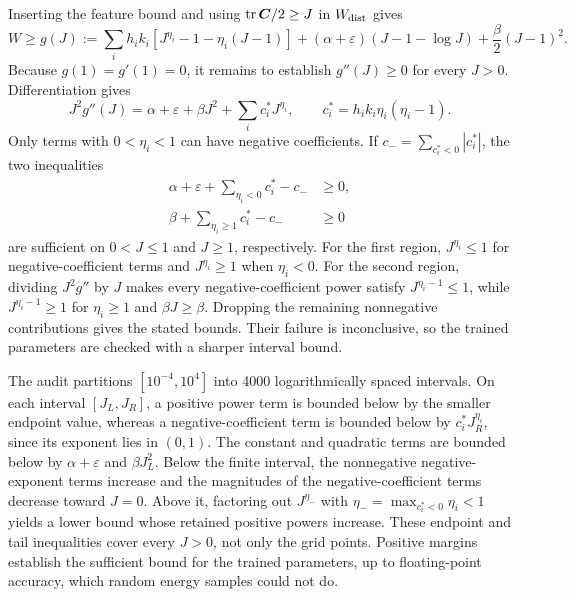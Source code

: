 Inserting the feature bound and using $\operatorname{tr}\bm C/2\geq J$ in $W_{\rm dist}$ gives
\begin{equation}
 W\geq g(J):=\sum_i h_i k_i[J^{\eta_i}-1-\eta_i(J-1)]
 +(\alpha+\varepsilon)(J-1-\log J)+\frac\beta2(J-1)^2.
 \label{eq:lowerbound}
\end{equation}
Because $g(1)=g'(1)=0$, it remains to establish $g''(J)\geq0$ for every $J>0$. Differentiation gives
\begin{equation}
 J^2g''(J)=\alpha+\varepsilon+\beta J^2+\sum_i c_i^*J^{\eta_i},
 \qquad c_i^*=h_i k_i\eta_i(\eta_i-1).
\end{equation}
Only terms with $0<\eta_i<1$ can have negative coefficients. If $c_-=\sum_{c_i^*<0}|c_i^*|$, the two inequalities
\begin{align}
 \alpha+\varepsilon+\sum_{\eta_i<0}c_i^*-c_-&\geq0,\\
 \beta+\sum_{\eta_i\geq1}c_i^*-c_-&\geq0
\end{align}
are sufficient on $0<J\leq1$ and $J\geq1$, respectively. For the first region, $J^{\eta_i}\leq1$ for negative-coefficient terms and $J^{\eta_i}\geq1$ when $\eta_i<0$. For the second region, dividing $J^2g''$ by $J$ makes every negative-coefficient power satisfy $J^{\eta_i-1}\leq1$, while $J^{\eta_i-1}\geq1$ for $\eta_i\geq1$ and $\beta J\geq\beta$. Dropping the remaining nonnegative contributions gives the stated bounds. Their failure is inconclusive, so the trained parameters are checked with a sharper interval bound.

The audit partitions $[10^{-4},10^4]$ into 4000 logarithmically spaced intervals. On each interval $[J_L,J_R]$, a positive power term is bounded below by the smaller endpoint value, whereas a negative-coefficient term is bounded below by $c_i^*J_R^{\eta_i}$, since its exponent lies in $(0,1)$. The constant and quadratic terms are bounded below by $\alpha+\varepsilon$ and $\beta J_L^2$. Below the finite interval, the nonnegative negative-exponent terms increase and the magnitudes of the negative-coefficient terms decrease toward $J=0$. Above it, factoring out $J^{\eta_-}$ with $\eta_-=\max_{c_i^*<0}\eta_i<1$ yields a lower bound whose retained positive powers increase. These endpoint and tail inequalities cover every $J>0$, not only the grid points. Positive margins establish the sufficient bound for the trained parameters, up to floating-point accuracy, which random energy samples could not do.

